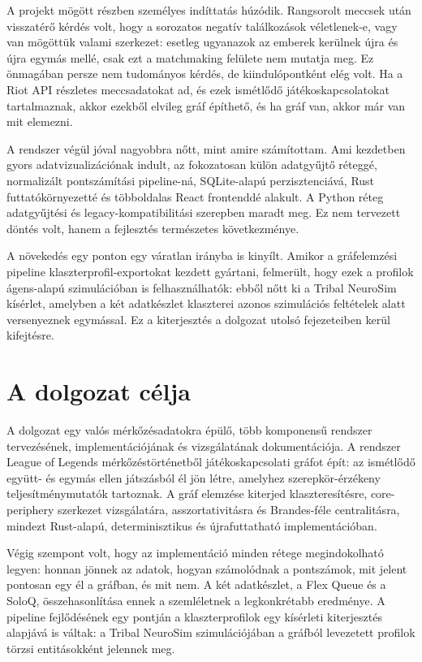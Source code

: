 A projekt mögött részben személyes indíttatás húzódik. Rangsorolt meccsek után visszatérő kérdés volt, hogy a sorozatos negatív találkozások véletlenek-e, vagy van mögöttük valami szerkezet: esetleg ugyanazok az emberek kerülnek újra és újra egymás mellé, csak ezt a matchmaking felülete nem mutatja meg. Ez önmagában persze nem tudományos kérdés, de kiindulópontként elég volt. Ha a Riot API részletes meccsadatokat ad, és ezek ismétlődő játékoskapcsolatokat tartalmaznak, akkor ezekből elvileg gráf építhető, és ha gráf van, akkor már van mit elemezni.

A rendszer végül jóval nagyobbra nőtt, mint amire számítottam. Ami kezdetben gyors adatvizualizációnak indult, az fokozatosan külön adatgyűjtő réteggé, normalizált pontszámítási pipeline-ná, SQLite-alapú perzisztenciává, Rust futtatókörnyezetté és többoldalas React frontenddé alakult. A Python réteg adatgyűjtési és legacy-kompatibilitási szerepben maradt meg. Ez nem tervezett döntés volt, hanem a fejlesztés természetes következménye.

A növekedés egy ponton egy váratlan irányba is kinyílt. Amikor a gráfelemzési pipeline klaszterprofil-exportokat kezdett gyártani, felmerült, hogy ezek a profilok ágens-alapú szimulációban is felhasználhatók: ebből nőtt ki a Tribal NeuroSim kísérlet, amelyben a két adatkészlet klaszterei azonos szimulációs feltételek alatt versenyeznek egymással. Ez a kiterjesztés a dolgozat utolsó fejezeteiben kerül kifejtésre.

\section{A dolgozat célja}

A dolgozat egy valós mérkőzésadatokra épülő, több komponensű rendszer tervezésének, implementációjának és vizsgálatának dokumentációja. A rendszer League of Legends mérkőzéstörténetből játékoskapcsolati gráfot épít: az ismétlődő együtt- és egymás ellen játszásból él jön létre, amelyhez szerepkör-érzékeny teljesítménymutatók tartoznak. A gráf elemzése kiterjed klaszteresítésre, core-periphery szerkezet vizsgálatára, asszortativitásra és Brandes-féle centralitásra, mindezt Rust-alapú, determinisztikus és újrafuttatható implementációban.

Végig szempont volt, hogy az implementáció minden rétege megindokolható legyen: honnan jönnek az adatok, hogyan számolódnak a pontszámok, mit jelent pontosan egy él a gráfban, és mit nem. A két adatkészlet, a Flex Queue és a SoloQ, összehasonlítása ennek a szemléletnek a legkonkrétabb eredménye. A pipeline fejlődésének egy pontján a klaszterprofilok egy kísérleti kiterjesztés alapjává is váltak: a Tribal NeuroSim szimulációjában a gráfból levezetett profilok törzsi entitásokként jelennek meg.

